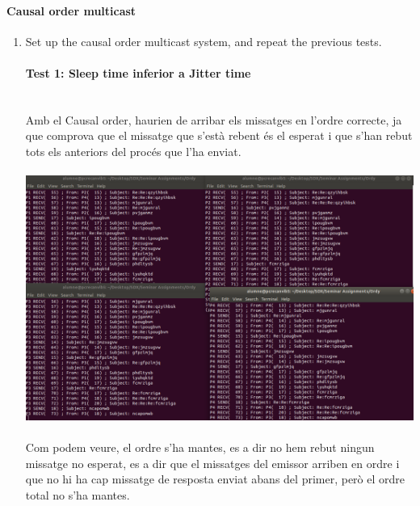 \documentclass[a4paper, 10pt]{article}
\begin{document}
\paragraph[bold]{Causal order multicast}
\begin{enumerate}
\item Set up the causal order multicast system, and repeat the previous tests.\\
\paragraph[bold]{Test 1: Sleep time inferior a Jitter time\\\\}
Amb el Causal order, haurien de arribar els missatges en l'ordre correcte, ja que comprova que el missatge que s’està rebent és el esperat i que s'han rebut tots els anteriors del procés que l'ha enviat.\\\\
\includegraphics[width=\textwidth]{ordy-causal-1}
\\\\Com podem veure, el ordre s'ha mantes, es a dir no hem rebut ningun missatge no esperat, es a dir que el missatges del emissor arriben en ordre i que no hi ha cap missatge de resposta enviat abans del primer, però el ordre total no s'ha mantes.

\newpage

\end{enumerate}
\end{document}
